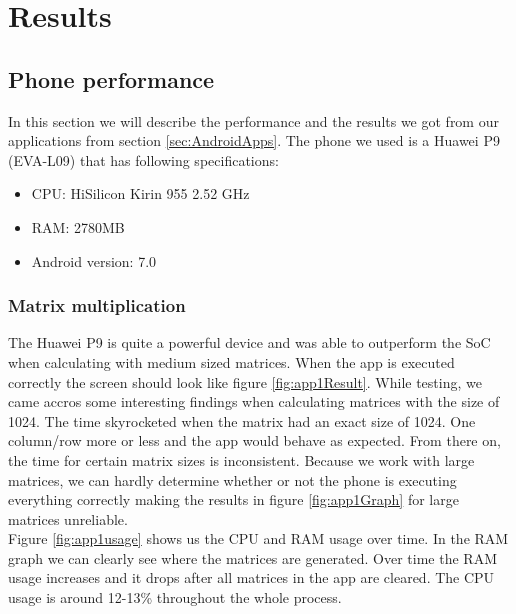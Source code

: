 \documentclass[a4paper, 11pt]{report}
\begin{document}
\chapter{Results}

\section{Phone performance}
In this section we will describe the performance and the results we got from our applications from section \ref{sec:AndroidApps}. The phone we used is a Huawei P9 (EVA-L09) that has following specifications:
\begin{itemize}
	\item{CPU: HiSilicon Kirin 955 2.52 GHz}
	\item{RAM: 2780MB}
	\item{Android version: 7.0}
\end{itemize}

	\subsection{Matrix multiplication}
The Huawei P9 is quite a powerful device and was able to outperform the SoC when calculating with medium sized matrices. When the app is executed correctly the screen should look like figure \ref{fig:app1Result}. While testing, we came accros some interesting findings when calculating matrices with the size of 1024. The time skyrocketed when the matrix had an exact size of 1024. One column/row more or less and the app would behave as expected. From there on, the time for certain matrix sizes is inconsistent. Because we work with large matrices, we can hardly determine whether or not the phone is executing everything correctly making the results in figure \ref{fig:app1Graph} for large matrices unreliable.\\
Figure \ref{fig:app1usage} shows us the CPU and RAM usage over time. In the RAM graph we can clearly see where the matrices are generated. Over time the RAM usage increases and it drops after all matrices in the app are cleared. The CPU usage is around 12-13\% throughout the whole process.
\end{document}

